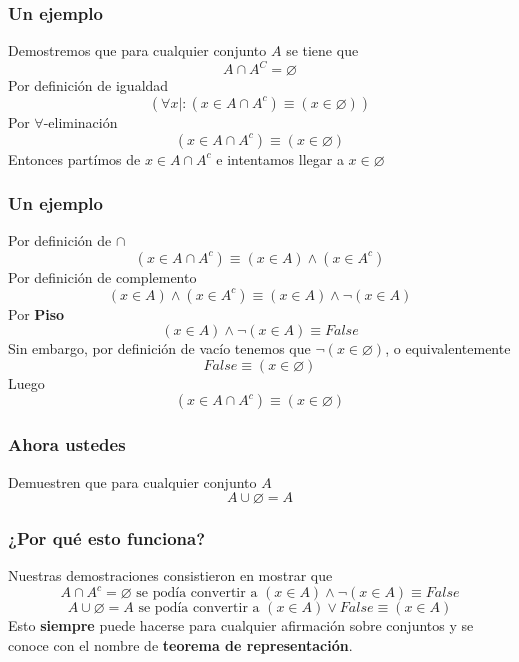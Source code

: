 \documentclass{beamer}
\begin{document}
\begin{frame}[fragile]
    \frametitle{Un ejemplo}
    \pause
    Demostremos que para cualquier conjunto $A$ se tiene que
    $$A \cap A^C = \varnothing$$
    \pause
    Por definición de igualdad
    $$(\forall x \mid : (x \in A \cap A^c) \equiv (x \in \varnothing))$$
    \pause
    Por $\forall$-eliminación
    $$(x \in A \cap A^c) \equiv (x \in \varnothing)$$
    \pause
    Entonces partímos de $x \in A \cap A^c$ e intentamos llegar a $x \in \varnothing$
\end{frame}

\begin{frame}[fragile]
    \frametitle{Un ejemplo}
    \pause
    Por definición de $\cap$
    $$(x \in A \cap A^c) \equiv (x \in A) \land (x \in A^c)$$
    \pause
    Por definición de complemento
    $$(x \in A) \land (x \in A^c) \equiv (x \in A) \land \lnot (x \in A)$$
    \pause
    Por \textbf{Piso}
    $$(x \in A) \land \lnot (x \in A) \equiv False$$
    \pause
    Sin embargo, por definición de vacío tenemos que $\lnot (x  \in \varnothing)$, o equivalentemente
    $$False \equiv (x \in \varnothing)$$
    \pause
    Luego
    $$(x \in A \cap A^c) \equiv (x \in \varnothing)$$
\end{frame}

\begin{frame}[fragile]
    \frametitle{Ahora ustedes}
    \pause
    Demuestren que para cualquier conjunto $A$
    $$A \cup \varnothing = A$$
    \vspace{160pt}
\end{frame}

\begin{frame}[fragile]
    \frametitle{¿Por qué esto funciona?}
    \pause
    Nuestras demostraciones consistieron en mostrar que
    \pause
    $$A \cap A^c = \varnothing \text{ se podía convertir a } (x \in A) \land \lnot (x \in A) \equiv False$$
    \pause
    $$A \cup \varnothing = A \text{ se podía convertir a } (x \in A) \lor False \equiv (x \in A)$$
    \pause
    Esto \textbf{siempre} puede hacerse para cualquier afirmación sobre conjuntos y se conoce con el nombre de \textbf{teorema de representación}.
\end{frame}
\end{document}
